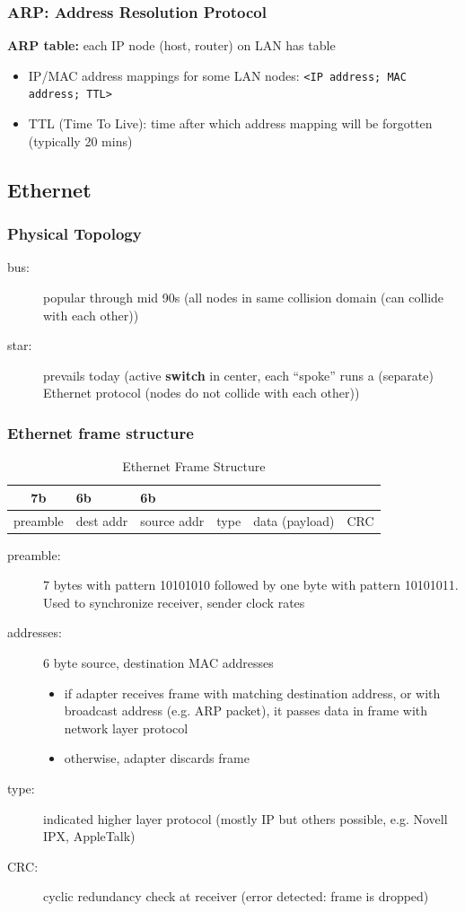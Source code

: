 \subsubsection{ARP: Address Resolution Protocol}\label{sec:arp}
\textbf{ARP table:} each IP node (host, router) on LAN has table
\begin{itemize}
	\item IP/MAC address mappings for some LAN nodes: \texttt{<IP address; MAC address; TTL>}
	\item TTL (Time To Live): time after which address mapping will be forgotten (typically 20 mins)
\end{itemize}

\subsection{Ethernet}
\subsubsection{Physical Topology}
\begin{description}
	\item[bus:] popular through mid 90s (all nodes in same collision domain (can collide with each other))
	\item[star:] prevails today (active \textbf{switch} in center, each ``spoke'' runs a (separate) Ethernet protocol (nodes do not collide with each other))
\end{description}
\subsubsection{Ethernet frame structure}
\begin{table}[H]
	\centering
	\caption{Ethernet Frame Structure}
	\begin{tabular}{c|p{1cm}|p{1cm}|c|p{1cm}|c}
		7b & 6b & 6b &&&\\
		\midrule
		preamble & dest addr & source addr & type & data (payload) & CRC
	\end{tabular}
\end{table}
\begin{description}
	\item[preamble:] 7 bytes with pattern 10101010 followed by one byte with pattern 10101011. Used to synchronize receiver, sender clock rates
	\item[addresses:] 6 byte source, destination MAC addresses
	\begin{itemize}
		\item if adapter receives frame with matching destination address, or with broadcast address (e.g. ARP packet), it passes data in frame with network layer protocol
		\item otherwise, adapter discards frame
	\end{itemize}
	\item[type:] indicated higher layer protocol (mostly IP but others possible, e.g. Novell IPX, AppleTalk)
	\item[CRC:] cyclic redundancy check at receiver (error detected: frame is dropped)
\end{description}
